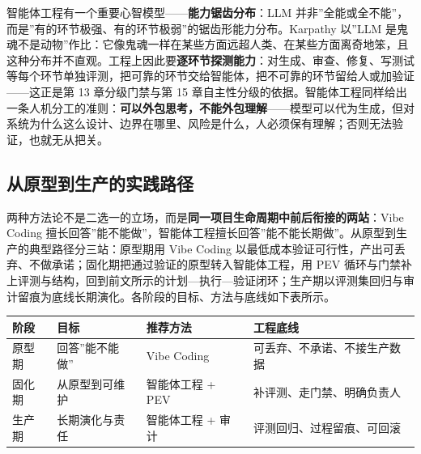 \documentclass[
]{ctexbook}
\newcounter{none}
\begin{document}
智能体工程有一个重要心智模型------\textbf{能力锯齿分布}：LLM
并非''全能或全不能''，而是''有的环节极强、有的环节极弱''的锯齿形能力分布。Karpathy
以''LLM
是鬼魂不是动物''作比：它像鬼魂一样在某些方面远超人类、在某些方面离奇地笨，且这种分布并不直观。工程上因此要\textbf{逐环节探测能力}：对生成、审查、修复、写测试等每个环节单独评测，把可靠的环节交给智能体，把不可靠的环节留给人或加验证------这正是第
13 章分级门禁与第 15
章自主性分级的依据。智能体工程同样给出一条人机分工的准则：\textbf{可以外包思考，不能外包理解}------模型可以代为生成，但对系统为什么这么设计、边界在哪里、风险是什么，人必须保有理解；否则无法验证，也就无从把关。

\subsection{从原型到生产的实践路径}\label{ux4eceux539fux578bux5230ux751fux4ea7ux7684ux5b9eux8df5ux8defux5f84}

两种方法论不是二选一的立场，而是\textbf{同一项目生命周期中前后衔接的两站}：Vibe
Coding
擅长回答''能不能做''，智能体工程擅长回答''能不能长期做''。从原型到生产的典型路径分三站：原型期用
Vibe Coding
以最低成本验证可行性，产出可丢弃、不做承诺；固化期把通过验证的原型转入智能体工程，用
PEV
循环与门禁补上评测与结构，回到前文所示的计划---执行---验证闭环；生产期以评测集回归与审计留痕为底线长期演化。各阶段的目标、方法与底线如下表所示。

{\def\LTcaptype{none} %
\begin{longtable}[]{@{}
  >{\raggedright\arraybackslash}p{}
  >{\raggedright\arraybackslash}p{}
  >{\raggedright\arraybackslash}p{}
  >{\raggedright\arraybackslash}p{}@{}}
\toprule\noalign{}
\begin{minipage}[b]{\linewidth}\raggedright
阶段
\end{minipage} & \begin{minipage}[b]{\linewidth}\raggedright
目标
\end{minipage} & \begin{minipage}[b]{\linewidth}\raggedright
推荐方法
\end{minipage} & \begin{minipage}[b]{\linewidth}\raggedright
工程底线
\end{minipage} \\
\midrule\noalign{}
\endhead
\bottomrule\noalign{}
\endlastfoot
原型期 & 回答''能不能做'' & Vibe Coding &
可丢弃、不承诺、不接生产数据 \\
固化期 & 从原型到可维护 & 智能体工程 + PEV &
补评测、走门禁、明确负责人 \\
生产期 & 长期演化与责任 & 智能体工程 + 审计 &
评测回归、过程留痕、可回滚 \\
\end{longtable}
}
\end{document}
